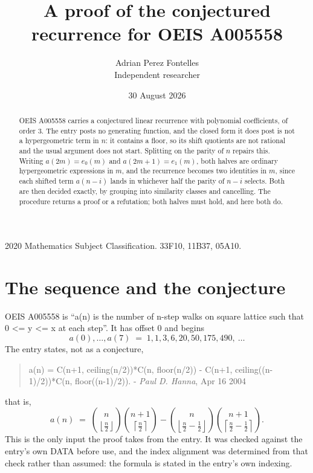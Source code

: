 \documentclass[11pt,a4paper]{article}
\title{A proof of the conjectured recurrence for OEIS A005558}
\author{Adrian Perez Fontelles\\ \small Independent researcher}
\date{30 August 2026}
\theoremstyle{plain}
\theoremstyle{definition}
\begin{document}
\maketitle

\begin{abstract}
OEIS A005558 carries a conjectured linear recurrence with polynomial coefficients, of
order 3. The entry posts no generating function, and the closed form it does post
is not a hypergeometric term in $n$: it contains a floor, so its shift quotients are not
rational and the usual argument does not start. Splitting on the parity of $n$ repairs
this. Writing $a(2m)=e_{0}(m)$ and $a(2m+1)=e_{1}(m)$, both halves are ordinary
hypergeometric expressions in $m$, and the recurrence becomes two identities in $m$, since
each shifted term $a(n-i)$ lands in whichever half the parity of $n-i$ selects. Both are
then decided exactly, by grouping into similarity classes and cancelling. The procedure
returns a proof or a refutation; both halves must hold, and here both do.
\end{abstract}

\noindent\small 2020 Mathematics Subject Classification. 33F10, 11B37, 05A10.\normalsize

\section{The sequence and the conjecture}

OEIS A005558 is ``a(n) is the number of n-step walks on square lattice such that 0 <= y <= x at each step''. It has offset $0$ and begins
\[
a(0),\dots,a(7)\;=\;1, 1, 3, 6, 20, 50, 175, 490,\ \dots
\]
The entry states, not as a conjecture,
\begin{quote}\small
a(n) = C(n+1, ceiling(n/2))*C(n, floor(n/2)) - C(n+1, ceiling((n-1)/2))*C(n, floor((n-1)/2)). - \emph{Paul D. Hanna}, Apr 16 2004
\end{quote}
that is,
\begin{equation}\label{eq:cf}
a(n)\;=\;{\binom{n}{\left\lfloor{\frac{n}{2}}\right\rfloor}} {\binom{n + 1}{\left\lceil{\frac{n}{2}}\right\rceil}} - {\binom{n}{\left\lfloor{\frac{n}{2} - \frac{1}{2}}\right\rfloor}} {\binom{n + 1}{\left\lceil{\frac{n}{2} - \frac{1}{2}}\right\rceil}} .
\end{equation}
This is the only input the proof takes from the entry. It was checked against the entry's
own DATA before use, and the index alignment was determined from that check rather than
assumed: the formula is stated in the entry's own indexing.
\end{document}
